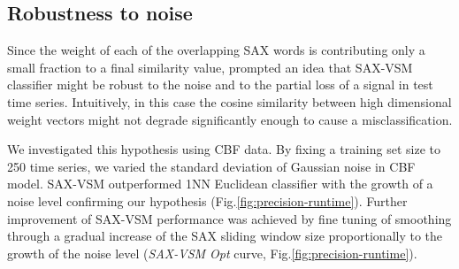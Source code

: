 \documentclass[conference]{IEEEtran}
\begin{document}
\subsection{Robustness to noise}
Since the weight of each of the overlapping SAX words is contributing only a small 
fraction to a final similarity value, prompted an idea that 
SAX-VSM classifier might be robust to the noise and to the partial loss of a signal in
test time series. Intuitively, in this case the cosine similarity between high dimensional 
weight vectors might not degrade significantly enough to cause a misclassification.


We investigated this hypothesis using CBF data. By fixing a training set size to 250 
time series, we varied the standard deviation of Gaussian noise in CBF model.
SAX-VSM outperformed 1NN Euclidean classifier with the growth of a noise level 
confirming our hypothesis (Fig.\ref{fig:precision-runtime}). 
Further improvement of SAX-VSM performance was achieved by fine tuning of smoothing 
through a gradual increase of the SAX sliding window size proportionally to the growth of 
the noise level (\textit{SAX-VSM Opt} curve, Fig.\ref{fig:precision-runtime}). 

\end{document}
